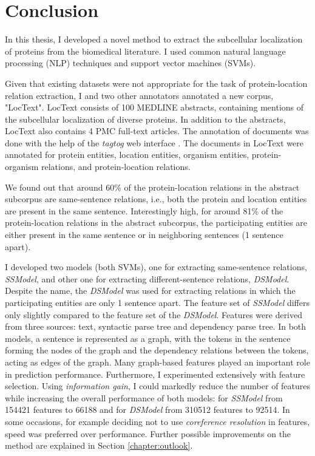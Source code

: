\chapter{Conclusion}\label{chapter:conclusion}

In this thesis, I developed a novel method to extract the subcellular localization of proteins from the biomedical literature. I used common natural language processing (NLP) techniques and support vector machines (SVMs).

Given that existing datasets were not appropriate for the task of protein-location relation extraction, I and two other annotators annotated a new corpus, "LocText". LocText consists of 100 MEDLINE \cite{medline} abstracts, containing mentions of the subcellular localization of diverse proteins. In addition to the abstracts, LocText also contains 4 PMC \cite{pmc} full-text articles. The annotation of documents was done with the help of the \textit{tagtog} web interface \cite{cejuela2014tagtog}. The documents in LocText were annotated for protein entities, location entities, organism entities, protein-organism relations, and protein-location relations.

We found out that around 60\% of the protein-location relations in the abstract subcorpus are same-sentence relations, i.e., both the protein and location entities are present in the same sentence. Interestingly high, for around 81\% of the protein-location relations in the abstract subcorpus, the participating entities are either present in the same sentence or in neighboring sentences (1 sentence apart).

I developed two models (both SVMs), one for extracting same-sentence relations, \textit{SSModel}, and other one for extracting different-sentence relations, \textit{DSModel}. Despite the name, the \textit{DSModel} was used for extracting relations in which the participating entities are only 1 sentence apart. The feature set of \textit{SSModel} differs only slightly compared to the feature set of the \textit{DSModel}. Features were derived from three sources: text, syntactic parse tree and dependency parse tree. In both models, a sentence is represented as a graph, with the tokens in the sentence forming the nodes of the graph and the dependency relations between the tokens, acting as edges of the graph. Many graph-based features played an important role in prediction performance. Furthermore, I experimented extensively with feature selection. Using \emph{information gain}, I could markedly reduce the number of features while increasing the overall performance of both models: for \textit{SSModel} from 154421 features to 66188 and for \textit{DSModel} from 310512 features to 92514. In some occasions, for example deciding not to use \emph{coreference resolution} in features, speed was preferred over performance. Further possible improvements on the method are explained in Section \ref{chapter:outlook}.

